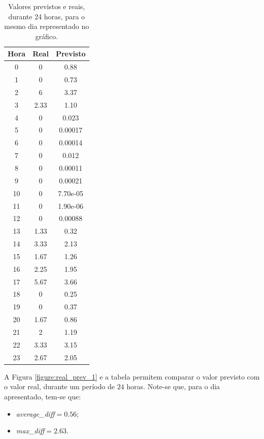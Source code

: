 \documentclass[a4paper, 12pt]{article}
\begin{document}
\begin{table}[H]
	\centering
	\begin{tabular}{||c||c|c||}
		\hline\hline
		Hora & Real&Previsto\\
		\hline\hline
		0 & 0
		&0.88 \\
		\hline
		1  &
		0 & 0.73\\
		\hline
		2 & 6 & 	3.37\\
		\hline
		3  & 
		2.33
		&1.10 \\
		\hline
		4 & 
		0 & 0.023\\
		\hline
		5  & 
		0 &0.00017 \\
		\hline
		6 & 
		0
		& 
		0.00014
		\\
		\hline
		7 & 0
		
		&0.012 \\
		\hline
		8  &0
		&0.00011 \\
		\hline
		9 &  0& 0.00021	\\
		\hline
		10 & 0
		
		& 7.70e-05\\
		\hline
		11  &0
		& 1.90e-06\\
		\hline
		12 &0  & 0.00088	\\
		\hline
		13  & 
		1.33
		&0.32 \\
		\hline
		14 & 
		3.33 &2.13\\
		\hline
		15  & 1.67
		& 1.26\\
		\hline
		16 & 
		2.25
		& 
		1.95
		\\
		\hline
		17 & 
		5.67
		& 3.66\\
		\hline
		18  &
		0 &0.25 \\
		\hline
		19 &  0& 0.37	\\
		\hline
		20 & 
		1.67
		&0.86 \\
		\hline
		21  &
		2 & 1.19\\
		\hline
		22 &  3.33& 3.15	\\
		\hline
		23  & 
		2.67 
		&2.05\\
		\hline\hline
	\end{tabular}
\caption{Valores previstos e reais, durante 24 horas, para o mesmo dia representado no gráfico.}
\end{table}

A Figura \ref{figure:real_prev_1} e a tabela permitem comparar o valor previsto com o valor real, durante um período de $24$ horas. Note-se que, para o dia apresentado, tem-se que:

\begin{itemize}
	\item \textit{average\_diff}$=0.56$;
	\item \textit{max\_diff}$=2.63$.
\end{itemize}
\end{document}
